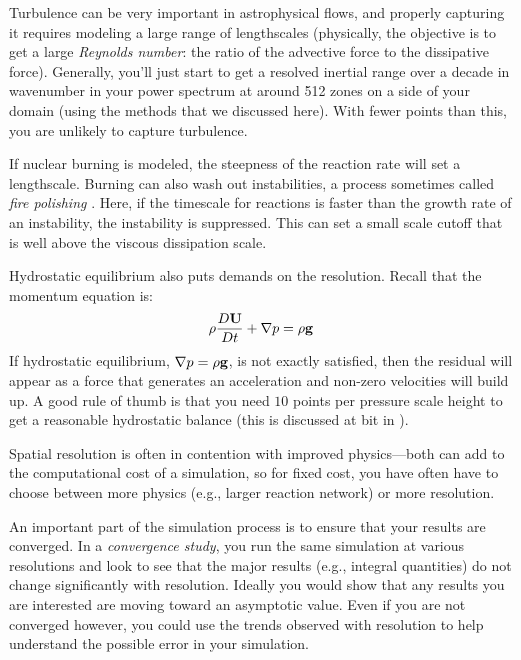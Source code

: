 Turbulence can be very important in astrophysical flows, and properly
capturing it requires modeling a large range of lengthscales
(physically, the objective is to get a large {\em Reynolds number}:
the ratio of the advective force to the dissipative force).
Generally, you'll just start to get a resolved inertial range over a
decade in wavenumber in your power spectrum at around 512 zones on a
side of your domain (using the methods that we discussed here).  With
fewer points than this, you are unlikely to capture turbulence.

If nuclear burning is modeled, the steepness of the reaction rate will
set a lengthscale.  Burning can also wash out instabilities, a process
sometimes called {\em fire polishing} \cite{timmeswoosley,SNrt}.
Here, if the timescale for reactions is faster than the growth rate of
an instability, the instability is suppressed.  This can set a small
scale cutoff that is well above the viscous dissipation scale.

Hydrostatic equilibrium also puts demands on the resolution.  Recall that
the momentum equation is:
\begin{equation}
\rho {\frac{{D{\bf U}}}{D t}} + \nabla p = \rho {\bf g}
\end{equation}
If hydrostatic equilibrium, $\nabla p = \rho {\bf g}$, is not exactly
satisfied, then the residual will appear as a force that generates an
acceleration and non-zero velocities will build up.  A good rule of
thumb is that you need $10$ points per pressure scale height to get a
reasonable hydrostatic balance (this is discussed at bit in
\cite{hse}).

Spatial resolution is often in contention with improved physics---both
can add to the computational cost of a simulation, so for fixed cost,
you have often have to choose between more physics (e.g., larger
reaction network) or more resolution.

An important part of the simulation process is to ensure that your
results are converged.  In a {\em convergence study}, you run the same
simulation at various resolutions and look to see that the major
results (e.g., integral quantities) do not change significantly with
resolution.  Ideally you would show that any results you are
interested are moving toward an asymptotic value.  Even if you are
not converged however, you could use the trends observed with resolution
to help understand the possible error in your simulation.






